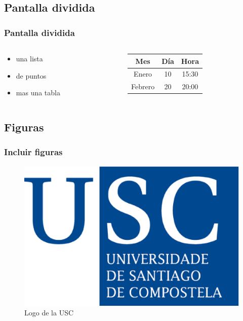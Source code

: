 \documentclass{beamer}
\begin{document}
\subsection{Pantalla dividida}

\begin{frame}
\frametitle{Pantalla dividida}
\begin{columns}
\begin{column}{5cm}
\begin{itemize}
\item una lista
\item de puntos 
\item mas una tabla 
\end{itemize}
\end{column}
\begin{column}{5cm}
\begin{tabular}{|c|c|c|} \hline
\textbf{Mes} & \textbf{Día} & \textbf{Hora} \\ \hline
Enero   & 10 & 15:30 \\ \hline
Febrero & 20 & 20:00 \\ \hline
\end{tabular}
\end{column}
\end{columns}
\end{frame}

\subsection{Figuras} 
\begin{frame}
\frametitle{Incluir figuras}
\begin{figure}
\includegraphics[scale=0.3]{../figuras/logo_usc.eps} 
\caption{Logo de la USC}
\end{figure}
\end{frame}
\end{document}
